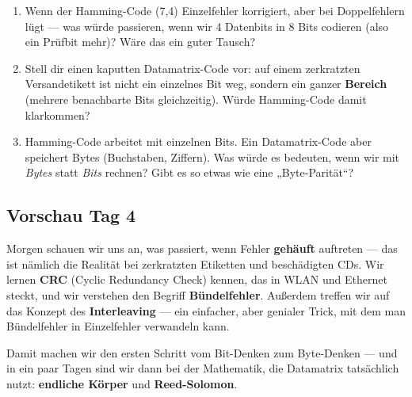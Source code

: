 \begin{enumerate}
\item Wenn der Hamming-Code (7,4) Einzelfehler korrigiert, aber bei
  Doppelfehlern lügt — was würde passieren, wenn wir 4 Datenbits in 8
  Bits codieren (also ein Prüfbit mehr)? Wäre das ein guter Tausch?

\item Stell dir einen kaputten Datamatrix-Code vor: auf einem
  zerkratzten Versandetikett ist nicht ein einzelnes Bit weg, sondern
  ein ganzer \textbf{Bereich} (mehrere benachbarte Bits gleichzeitig).
  Würde Hamming-Code damit klarkommen?

\item Hamming-Code arbeitet mit einzelnen Bits. Ein Datamatrix-Code
  aber speichert Bytes (Buchstaben, Ziffern). Was würde es bedeuten,
  wenn wir mit \emph{Bytes} statt \emph{Bits} rechnen? Gibt es so
  etwas wie eine „Byte-Parität“?
\end{enumerate}

\subsection*{Vorschau Tag 4}

Morgen schauen wir uns an, was passiert, wenn Fehler \textbf{gehäuft}
auftreten — das ist nämlich die Realität bei zerkratzten Etiketten und
beschädigten CDs. Wir lernen \textbf{CRC} (Cyclic Redundancy Check)
kennen, das in WLAN und Ethernet steckt, und wir verstehen den Begriff
\textbf{Bündelfehler}. Außerdem treffen wir auf das Konzept des
\textbf{Interleaving} — ein einfacher, aber genialer Trick, mit dem
man Bündelfehler in Einzelfehler verwandeln kann.

Damit machen wir den ersten Schritt vom Bit-Denken zum Byte-Denken —
und in ein paar Tagen sind wir dann bei der Mathematik, die Datamatrix
tatsächlich nutzt: \textbf{endliche Körper} und \textbf{Reed-Solomon}.

